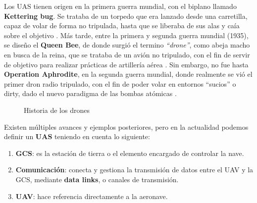 Los \ac{UAS} tienen origen en la primera guerra mundial, con el biplano llamado \textbf{Kettering bug}. Se trataba de un torpedo que era lanzado desde una carretilla, capaz de volar de forma no tripulada, hasta que se liberaba de sus alas y caía sobre el objetivo \cite{kettering-bug}. Más tarde, entre la primera y segunda guerra mundial (1935), se diseño el \textbf{Queen Bee}, de donde surgió el termino \emph{``drone''}, como abeja macho en busca de la reina, que se trataba de un avión no tripulado, con el fin de servir de objetivo para realizar prácticas de artillería aérea \cite{queen-bee}. Sin embargo, no fue hasta \textbf{Operation Aphrodite}, en la segunda guerra mundial, donde realmente se vió el primer dron radio tripulado, con el fin de poder volar en entornos ``sucios'' o dirty, dado el nuevo paradigma de las bombas atómicas \cite{operation-aphrodite}.\\

\begin{figure} [h]
	\centering
	\quad
	\quad
	\caption{Historia de los drones}
	\label{fig:drone_history}
\end{figure}

Existen múltiples avances y ejemplos posteriores, pero en la actualidad podemos definir un \textbf{\ac{UAS}} teniendo en cuenta lo siguiente:

\begin{enumerate}
	\item \textbf{\ac{GCS}}: es la estación de tierra o el elemento encargado de controlar la nave.

	\item \textbf{Comunicación}: conecta y gestiona la transmisión de datos entre el \ac{UAV} y la \ac{GCS}, mediante \textbf{data links}, o canales de transmisión.
	
    \item \textbf{\ac{UAV}}: hace referencia directamente a la aeronave.
\end{enumerate} \cite{uas-definicion} \cite{gcs-definicion} \cite{data-link-definicion} \\

